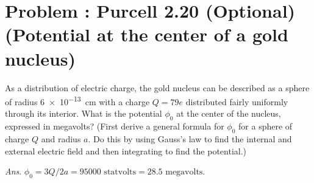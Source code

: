 \documentclass[problems]{esg8022pset}
\begin{document}
\section{Problem \thesection: Purcell 2.20 (Optional) (Potential at the center of a gold nucleus)}
  As a distribution of electric charge, the gold nucleus can be
  described as a sphere of radius \SI{6e-13}{\centi\meter} with a charge $Q = 79e$
  distributed fairly uniformly through its interior. What is the potential
  $\phi_0$ at the center of the nucleus, expressed in megavolts? (First derive
  a general formula for $\phi_0$ for a sphere of charge $Q$ and radius $a$. Do
  this by using Gauss's law to find the internal and external electric field
  and then integrating to find the potential.)
  \begin{flushright} \emph{Ans}. $\phi_0 = 3Q/2a = \num{95000}\text{ statvolts} = 28.5\text{ megavolts}$. \end{flushright}
\end{document}
